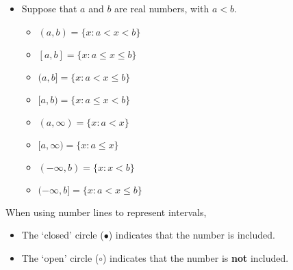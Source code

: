 \documentclass[12pt,a4paper,titlepage]{article}
\begin{document}
            \begin{SummaryBox}[title=Interval notation]
                \begin{itemize}[leftmargin=*]
                    \item Suppose that $a$ and $b$ are real numbers, with $a<b$.
                    \begin{multicols}{2}
                    \begin{itemize}[topsep=0pt]
                        \item $(a,b)      =\{x:a<    x<    b\}$
                        \item $[a,b]      =\{x:a\leq x\leq b\}$
                        \item $(a,b]      =\{x:a<    x\leq b\}$
                        \item $[a,b)      =\{x:a\leq x<    b\}$
                        \item $(a,\infty) =\{x:a<    x      \}$
                        \item $[a,\infty) =\{x:a\leq x      \}$
                        \item $(-\infty,b)=\{x:      x<    b\}$
                        \item $(-\infty,b]=\{x:a<    x\leq b\}$
                    \end{itemize}
                    \end{multicols}
                \end{itemize}
                \tcblower
                When using number lines to represent intervals,
                \begin{itemize}[topsep=0pt]
                    \item The `closed' circle ($\bullet$) indicates that the number is included.
                    \item The `open' circle ($\circ$) indicates that the number is \textbf{not} included.
                \end{itemize}
            \end{SummaryBox}
            
\end{document}
